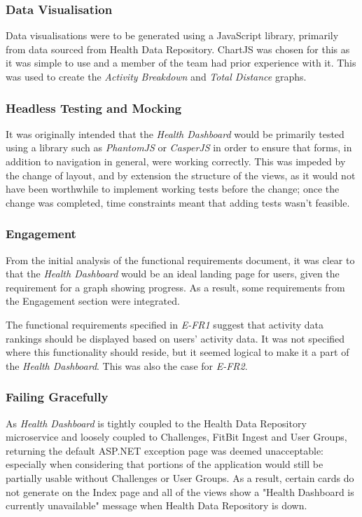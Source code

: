 \subsubsection{Data Visualisation}
\par
Data visualisations were to be generated using a JavaScript library, primarily from data sourced from Health Data Repository. ChartJS\cite{chartjs} was chosen for this as it was simple to use and a member of the team had prior experience with it. This was used to create the \textit{Activity Breakdown} and \textit{Total Distance} graphs.

\subsubsection{Headless Testing and Mocking}
\par
It was originally intended that the \textit{Health Dashboard} would be primarily tested using a library such as \textit{PhantomJS} or \textit{CasperJS} in order to ensure that forms, in addition to navigation in general, were working correctly. This was impeded by the change of layout, and by extension the structure of the views, as it would not have been worthwhile to implement working tests before the change; once the change was completed, time constraints meant that adding tests wasn't feasible.

\subsubsection{Engagement}
\par
From the initial analysis of the functional requirements document, it was clear to that the \textit{Health Dashboard} would be an ideal landing page for users, given the requirement for a graph showing progress. As a result, some requirements from the Engagement section were integrated.

\par
The functional requirements specified in \textit{E-FR1} suggest that activity data rankings should be displayed based on users' activity data. It was not specified where this functionality should reside, but it seemed logical to make it a part of the \textit{Health Dashboard}. This was also the case for \textit{E-FR2}.

\subsubsection{Failing Gracefully}
\par
As \textit{Health Dashboard} is tightly coupled to the Health Data Repository microservice and loosely coupled to Challenges, FitBit Ingest and User Groups, returning the default ASP.NET exception page was deemed unacceptable: especially when considering that portions of the application would still be partially usable without Challenges or User Groups. As a result, certain cards do not generate on the Index page and all of the views show a "Health Dashboard is currently unavailable" message when Health Data Repository is down.